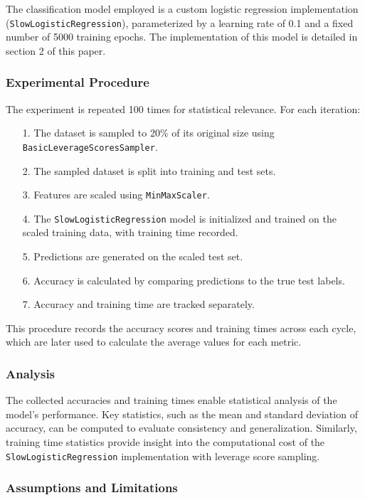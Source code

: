 \documentclass{article}
\theoremstyle{plain}
\theoremstyle{definition}
\theoremstyle{remark}
\begin{document}
The classification model employed is a custom logistic regression implementation (\texttt{SlowLogisticRegression}), parameterized by a learning rate of 0.1 and a fixed number of 5000 training epochs. The implementation of this model is detailed in section 2 of this paper.

\subsubsection{Experimental Procedure}

The experiment is repeated 100 times for statistical relevance. For each iteration:

\begin{itemize}
 \item [1.] The dataset is sampled to 20\% of its original size using \texttt{BasicLeverageScoresSampler}.
 \item [2.] The sampled dataset is split into training and test sets.
 \item [3.] Features are scaled using \texttt{MinMaxScaler}.
 \item [4.] The \texttt{SlowLogisticRegression} model is initialized and trained on the scaled training data, with training time recorded.
 \item [5.] Predictions are generated on the scaled test set.
 \item [6.] Accuracy is calculated by comparing predictions to the true test labels.
 \item [7.] Accuracy and training time are tracked separately.
\end{itemize}

This procedure records the accuracy scores and training times across each cycle, which are later used to calculate the average values for each metric.

\subsubsection{Analysis}

The collected accuracies and training times enable statistical analysis of the model's performance. Key statistics, such as the mean and standard deviation of accuracy, can be computed to evaluate consistency and generalization. Similarly, training time statistics provide insight into the computational cost of the \texttt{SlowLogisticRegression} implementation with leverage score sampling.

\subsubsection{Assumptions and Limitations}
\end{document}
